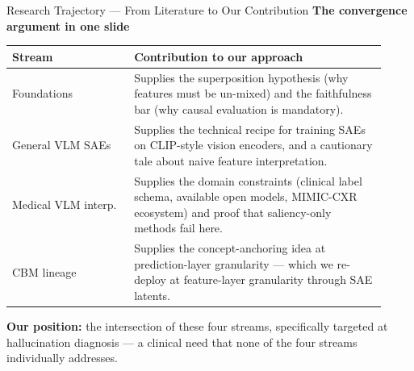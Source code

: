 \documentclass[aspectratio=169,11pt]{beamer}
\begin{document}
\begin{frame}{Research Trajectory --- From Literature to Our Contribution}
    \textbf{The convergence argument in one slide}

    \vspace{0.5em}
    \begin{center}
    \begin{tabular}{@{}p{0.3\linewidth}p{0.62\linewidth}@{}}
        \toprule
        \textbf{Stream} & \textbf{Contribution to our approach} \\
        \midrule
        Foundations &
        Supplies the superposition hypothesis (why features must be un-mixed) and the faithfulness bar (why causal evaluation is mandatory). \\
        \addlinespace
        General VLM SAEs &
        Supplies the technical recipe for training SAEs on CLIP-style vision encoders, and a cautionary tale about naive feature interpretation. \\
        \addlinespace
        Medical VLM interp. &
        Supplies the domain constraints (clinical label schema, available open models, MIMIC-CXR ecosystem) and proof that saliency-only methods fail here. \\
        \addlinespace
        CBM lineage &
        Supplies the concept-anchoring idea at prediction-layer granularity --- which we re-deploy at feature-layer granularity through SAE latents. \\
        \bottomrule
    \end{tabular}
    \end{center}

    \vspace{0.6em}
    \textbf{Our position:} the intersection of these four streams, specifically targeted at hallucination diagnosis --- a clinical need that none of the four streams individually addresses.
\end{frame}
\end{document}
